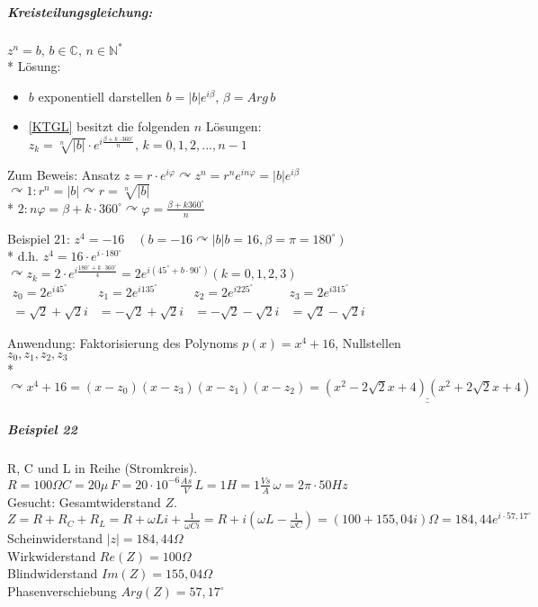 \documentclass[a4paper]{scrartcl}
\begin{document}
\subparagraph{Kreisteilungsgleichung:} $z^n = b, \, b \in \mathbb{C},\, n\in \mathbb{N}^*$ \label{KTGL}\\*
Lösung:
\begin{itemize}
\item $b$ exponentiell darstellen $b=\lvert b \rvert e^{i\beta},\, \beta = Arg\, b$
\item \ref{KTGL} besitzt die folgenden $n$ Lösungen:\\
$z_k = \sqrt[n]{\lvert b\rvert} \cdot e^{i \frac{\beta + k \cdot 360^\circ}{n}}, \, k = 0,1,2,...,n-1$
\end{itemize}

Zum Beweis: Ansatz $z=r\cdot e^{i\varphi} \curvearrowright z^n = r^n e^{in\varphi}=\lvert b\rvert e^{i\beta}$\\
$\curvearrowright 1: r^n =\lvert b\rvert \curvearrowright r =\sqrt[n]{\lvert b \rvert}$\\*
$2: n\varphi = \beta + k \cdot 360^\circ \curvearrowright \varphi=\frac{\beta + k 360^\circ}{n}$

Beispiel 21: $z^4=-16 \quad (b=-16 \curvearrowright \lvert b \rvert b = 16, \beta = \pi = 180^\circ )$\\*
d.h. $z^4 = 16 \cdot e^{i\cdot 180^\circ}$\\
$\curvearrowright z_k= 2\cdot e^{i\frac{180^\circ + k \cdot 360^\circ}{4}}=2e^{i (45^\circ + b \cdot 90^\circ )} (k=0,1,2,3)$\\

$\begin{array}{c|c|c|c}
z_0 = 2 e^{i 45^\circ} & z_1=2e^{i 135^\circ} & z_2= 2 e^{i 225^\circ} & z_3=2 e ^{i 315^\circ}\\
=\sqrt{2} +\sqrt{2} i & =-\sqrt{2} +\sqrt{2} i&=-\sqrt{2} -\sqrt{2} i&=\sqrt{2} -\sqrt{2} i
\end{array}$

Anwendung: Faktorisierung des Polynoms $p(x) = x^4 + 16$, Nullstellen $z_0,z_1,z_2,z_3$\\*
$\curvearrowright x^4 +16 = (x-z_0)(x-z_3)(x-z_1)(x-z_2)= \underline{\underline{(x^2 - 2 \sqrt{2} x + 4) (x^2 + 2 \sqrt{2} x +4)}}$

\subparagraph{Beispiel 22}
R, C und L in Reihe (Stromkreis). $R=100\Omega C=20\mu \, F = 20\cdot 10^{-6} \frac{As}{V} \, L = 1H = 1 \frac{Vs}{A} \, \omega = 2 \pi \cdot 50 Hz$\\
Gesucht: Gesamtwiderstand $Z$.
$Z=R + R_C + R_L = R + \omega L i + \frac{1}{\omega C i} = R + i(\omega L - \frac{1}{\omega C}) = (100 + 155,04 i ) \Omega = 184,44 e^{i \cdot 57,17^\circ}$\\
Scheinwiderstand $\lvert z \rvert = 184,44 \Omega$\\
Wirkwiderstand $Re(Z) = 100 \Omega$\\
Blindwiderstand $Im(Z) = 155,04 \Omega$\\
Phasenverschiebung $Arg(Z) = 57,17^\circ$
\end{document}
